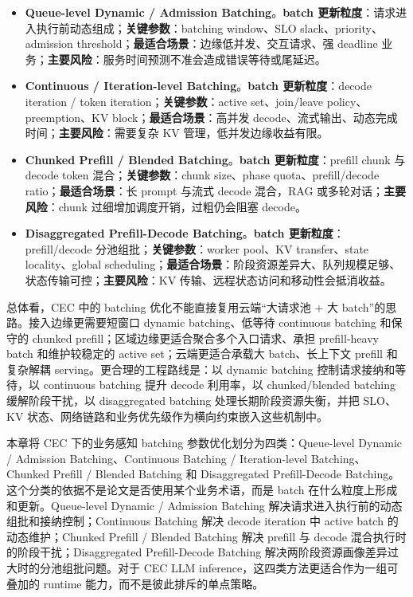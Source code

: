 \documentclass[a4paper,twocolumn,10pt]{ctexart}
\begin{document}
\begin{itemize}
\item \textbf{Queue-level Dynamic / Admission Batching}。\textbf{batch 更新粒度}：请求进入执行前动态组成；\textbf{关键参数}：batching window、SLO slack、priority、admission threshold；\textbf{最适合场景}：边缘低并发、交互请求、强 deadline 业务；\textbf{主要风险}：服务时间预测不准会造成错误等待或尾延迟。
\item \textbf{Continuous / Iteration-level Batching}。\textbf{batch 更新粒度}：decode iteration / token iteration；\textbf{关键参数}：active set、join/leave policy、preemption、KV block；\textbf{最适合场景}：高并发 decode、流式输出、动态完成时间；\textbf{主要风险}：需要复杂 KV 管理，低并发边缘收益有限。
\item \textbf{Chunked Prefill / Blended Batching}。\textbf{batch 更新粒度}：prefill chunk 与 decode token 混合；\textbf{关键参数}：chunk size、phase quota、prefill/decode ratio；\textbf{最适合场景}：长 prompt 与流式 decode 混合，RAG 或多轮对话；\textbf{主要风险}：chunk 过细增加调度开销，过粗仍会阻塞 decode。
\item \textbf{Disaggregated Prefill-Decode Batching}。\textbf{batch 更新粒度}：prefill/decode 分池组批；\textbf{关键参数}：worker pool、KV transfer、state locality、global scheduling；\textbf{最适合场景}：阶段资源差异大、队列规模足够、状态传输可控；\textbf{主要风险}：KV 传输、远程状态访问和移动性会抵消收益。
\end{itemize}





总体看，CEC 中的 batching 优化不能直接复用云端“大请求池 + 大 batch”的思路。接入边缘更需要短窗口 dynamic batching、低等待 continuous batching 和保守的 chunked prefill；区域边缘更适合聚合多个入口请求、承担 prefill-heavy batch 和维护较稳定的 active set；云端更适合承载大 batch、长上下文 prefill 和复杂解耦 serving。更合理的工程路线是：以 dynamic batching 控制请求接纳和等待，以 continuous batching 提升 decode 利用率，以 chunked/blended batching 缓解阶段干扰，以 disaggregated batching 处理长期阶段资源失衡，并把 SLO、KV 状态、网络链路和业务优先级作为横向约束嵌入这些机制中。


本章将 CEC 下的业务感知 batching 参数优化划分为四类：Queue-level Dynamic / Admission Batching、Continuous Batching / Iteration-level Batching、Chunked Prefill / Blended Batching 和 Disaggregated Prefill-Decode Batching。这个分类的依据不是论文是否使用某个业务术语，而是 batch 在什么粒度上形成和更新。Queue-level Dynamic / Admission Batching 解决请求进入执行前的动态组批和接纳控制；Continuous Batching 解决 decode iteration 中 active batch 的动态维护；Chunked Prefill / Blended Batching 解决 prefill 与 decode 混合执行时的阶段干扰；Disaggregated Prefill-Decode Batching 解决两阶段资源画像差异过大时的分池组批问题。对于 CEC LLM inference，这四类方法更适合作为一组可叠加的 runtime 能力，而不是彼此排斥的单点策略。
\end{document}
